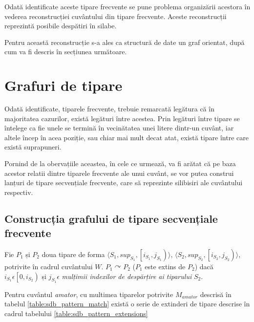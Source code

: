 Odată identificate aceste tipare frecvente se pune problema organizării acestora în vederea reconstrucției cuvântului din tipare frecvente. Aceste reconstrucții reprezintă posibile despătiri în silabe. 

Pentru această reconstrucție s-a ales ca structură de date un graf orientat, după cum va fi descris în secțiunea următoare.

\section{Grafuri de tipare}

Odată identificate, tiparele frecvente, trebuie remarcată legătura că în majoritatea cazurilor, există legături între acestea. Prin legături între tipare se întelege ca fie unele se termină în vecinătatea unei litere dintr-un cuvânt, iar altele încep în acea poziție, sau chiar mai mult decat atat, există tipare între care există suprapuneri. 

Pornind de la obervațiile aceastea, în cele ce urmează, va fi arătat că pe baza acestor relatii dintre tiparele frecvente ale unui cuvânt, se vor putea construi lanțuri de tipare secvențiale frecvente, care să reprezinte silibisiri ale cuvântului respectiv.

\subsection{Construcția grafului de tipare secvențiale frecvente}
\begin{defi}
Fie $P_1$ și $P_2$ doua tipare de forma  $\langle S_1,sup_{S_1}, \left[i_{S_1},j_{S_1}\right) \rangle$, $\langle S_2,sup_{S_2}, \left[i_{S_2},j_{S_2}\right)\rangle $, potrivite în cadrul cuvântului $W$. $P_1 \curvearrowright P_2$ ($P_1$ este extins de $P_2$) dacă $i_{S_1} \epsilon \left[0, i_{S_2}\right)$ și $j_{S_1}\epsilon $ \textit{mulțimii indexilor de despărțire ai tiparului} $S_2$. 
\end{defi}

\begin{ex}
Pentru cuvântul \textit{amator}, cu multimea tiparelor potrivite $M_{amator}$ descrisă în tabelul \ref{table:sdb_pattern_match} există o serie de extinderi de tipare descrise în cadrul tabelului \ref{table:sdb_pattern_extensions}
\end{ex}

